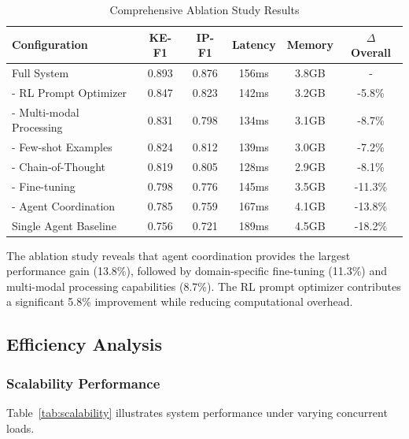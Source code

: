 \documentclass[11pt,a4paper]{article}
\begin{document}
\begin{table}[htbp]
\centering
\caption{Comprehensive Ablation Study Results}
\label{tab:ablation_detailed}
\begin{tabular}{lccccc}
\toprule
\textbf{Configuration} & \textbf{KE-F1} & \textbf{IP-F1} & \textbf{Latency} & \textbf{Memory} & \textbf{$\Delta$ Overall} \\
\midrule
Full System & 0.893 & 0.876 & 156ms & 3.8GB & - \\
\midrule
- RL Prompt Optimizer & 0.847 & 0.823 & 142ms & 3.2GB & -5.8\% \\
- Multi-modal Processing & 0.831 & 0.798 & 134ms & 3.1GB & -8.7\% \\
- Few-shot Examples & 0.824 & 0.812 & 139ms & 3.0GB & -7.2\% \\
- Chain-of-Thought & 0.819 & 0.805 & 128ms & 2.9GB & -8.1\% \\
- Fine-tuning & 0.798 & 0.776 & 145ms & 3.5GB & -11.3\% \\
- Agent Coordination & 0.785 & 0.759 & 167ms & 4.1GB & -13.8\% \\
\midrule
Single Agent Baseline & 0.756 & 0.721 & 189ms & 4.5GB & -18.2\% \\
\bottomrule
\end{tabular}
\end{table}

The ablation study reveals that agent coordination provides the largest performance gain (13.8\%), followed by domain-specific fine-tuning (11.3\%) and multi-modal processing capabilities (8.7\%). The RL prompt optimizer contributes a significant 5.8\% improvement while reducing computational overhead.

\subsection{Efficiency Analysis}

\subsubsection{Scalability Performance}

Table~\ref{tab:scalability} illustrates system performance under varying concurrent loads.
\end{document}
